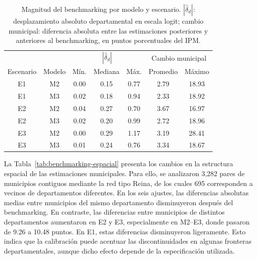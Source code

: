 \begin{table}[!htbp]
\centering
\footnotesize
\caption{Magnitud del benchmarking por modelo y escenario. $|\hat{\delta}_d|$: desplazamiento absoluto departamental en escala logit; cambio municipal: diferencia absoluta entre las estimaciones posteriores y anteriores al benchmarking, en puntos porcentuales del IPM.}
\label{tab:benchmarking}
\renewcommand{\arraystretch}{1.1}
\setlength{\tabcolsep}{7pt}
\begin{tabular}{c c c c c c c}
\hline
 & & \multicolumn{3}{c}{$|\hat{\delta}_d|$} &
\multicolumn{2}{c}{Cambio municipal} \\
Escenario & Modelo & Mín. & Mediana & Máx. & Promedio & Máximo \\
\hline
E1 & M2 & 0.00 & 0.15 & 0.77 & 2.79 & 18.93 \\
E1 & M3 & 0.02 & 0.18 & 0.94 & 2.33 & 18.92 \\
E2 & M2 & 0.04 & 0.27 & 0.70 & 3.67 & 16.97 \\
E2 & M3 & 0.02 & 0.20 & 0.99 & 2.72 & 18.96 \\
E3 & M2 & 0.00 & 0.29 & 1.17 & 3.19 & 28.41 \\
E3 & M3 & 0.01 & 0.24 & 0.76 & 3.34 & 18.67 \\
\hline
\end{tabular}
\end{table}

La Tabla~\ref{tab:benchmarking-espacial} presenta los cambios en la estructura espacial de las estimaciones municipales. Para ello, se analizaron 3{,}282 pares de municipios contiguos mediante la red tipo Reina, de los cuales 695 corresponden a vecinos de departamentos diferentes. En los seis ajustes, las diferencias absolutas medias entre municipios del mismo departamento disminuyeron después del benchmarking. En contraste, las diferencias entre municipios de distintos departamentos aumentaron en E2 y E3, especialmente en M2--E3, donde pasaron de 9.26 a 10.48 puntos. En E1, estas diferencias disminuyeron ligeramente. Esto indica que la calibración puede acentuar las discontinuidades en algunas fronteras departamentales, aunque dicho efecto depende de la especificación utilizada.

